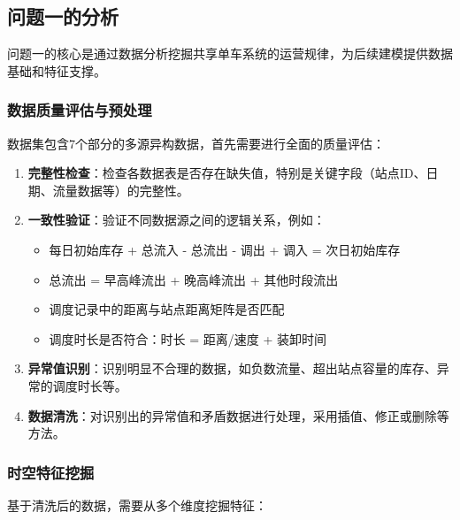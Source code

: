 \documentclass[12pt,a4paper]{ctexart}
\begin{document}
\subsection{问题一的分析}

问题一的核心是通过数据分析挖掘共享单车系统的运营规律，为后续建模提供数据基础和特征支撑。

\subsubsection{数据质量评估与预处理}

数据集包含7个部分的多源异构数据，首先需要进行全面的质量评估：

\begin{enumerate}
    \item \textbf{完整性检查}：检查各数据表是否存在缺失值，特别是关键字段（站点ID、日期、流量数据等）的完整性。

    \item \textbf{一致性验证}：验证不同数据源之间的逻辑关系，例如：
    \begin{itemize}
        \item 每日初始库存 + 总流入 - 总流出 - 调出 + 调入 = 次日初始库存
        \item 总流出 = 早高峰流出 + 晚高峰流出 + 其他时段流出
        \item 调度记录中的距离与站点距离矩阵是否匹配
        \item 调度时长是否符合：时长 = 距离/速度 + 装卸时间
    \end{itemize}

    \item \textbf{异常值识别}：识别明显不合理的数据，如负数流量、超出站点容量的库存、异常的调度时长等。

    \item \textbf{数据清洗}：对识别出的异常值和矛盾数据进行处理，采用插值、修正或删除等方法。
\end{enumerate}

\subsubsection{时空特征挖掘}

基于清洗后的数据，需要从多个维度挖掘特征：
\end{document}
